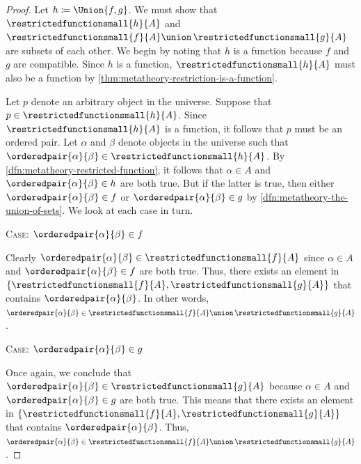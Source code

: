 \begin{proof}
    Let \( h \coloneq \Union \mleft\{ f, g \mright\} \).
    We must show that \( \restrictedfunctionsmall{h}{A} \) and \( \restrictedfunctionsmall{f}{A} \union \, \restrictedfunctionsmall{g}{A} \) are subsets of each other.
    We begin by noting that \( h \) is a function because \( f \) and \( g \) are compatible.
    Since \( h \) is a function, \( \restrictedfunctionsmall{h}{A} \) must also be a function by \cref{thm:metatheory-restriction-is-a-function}.

    \vspace{0.3cm}
    \noindent
    Let \( p \) denote an arbitrary object in the universe.
    Suppose that \( p \in \restrictedfunctionsmall{h}{A} \).
    Since \( \restrictedfunctionsmall{h}{A} \) is a function, it follows that \( p \) must be an ordered pair.
    Let \( \alpha \) and \( \beta \) denote objects in the universe such that \( \orderedpair{\alpha}{\beta} \in \restrictedfunctionsmall{h}{A} \).
    By \cref{dfn:metatheory-restricted-function}, it follows that \( \alpha \in A \) and \( \orderedpair{\alpha}{\beta} \in h \) are both true.
    But if the latter is true, then either \( \orderedpair{\alpha}{\beta} \in f \) or \( \orderedpair{\alpha}{\beta} \in g \) by
    \cref{dfn:metatheory-the-union-of-sets}.
    We look at each case in turn.

    \vspace{0.3cm}
    \noindent
    {\scshape Case:} \( \orderedpair{\alpha}{\beta} \in f \)

    \vspace{0.1cm}
    \noindent
    Clearly \( \orderedpair{\alpha}{\beta} \in \restrictedfunctionsmall{f}{A} \) since \( \alpha \in A \) and \( \orderedpair{\alpha}{\beta} \in f \) are both true.
    Thus, there exists an element in \( \mleft\{ \restrictedfunctionsmall{f}{A}, \restrictedfunctionsmall{g}{A} \mright\} \) that contains \( \orderedpair{\alpha}{\beta} \).
    In other words, \( \orderedpair{\alpha}{\beta} \in \restrictedfunctionsmall{f}{A} \union \, \restrictedfunctionsmall{g}{A} \).

    \vspace{0.3cm}
    \noindent
    {\scshape Case:} \( \orderedpair{\alpha}{\beta} \in g \)

    \vspace{0.1cm}
    \noindent
    Once again, we conclude that \( \orderedpair{\alpha}{\beta} \in \restrictedfunctionsmall{g}{A} \) because \( \alpha \in A \) and \( \orderedpair{\alpha}{\beta} \in g \)
    are both true.
    This means that there exists an element in \( \mleft\{ \restrictedfunctionsmall{f}{A}, \restrictedfunctionsmall{g}{A} \mright\} \)
    that contains \( \orderedpair{\alpha}{\beta} \).
    Thus, \( \orderedpair{\alpha}{\beta} \in \restrictedfunctionsmall{f}{A} \union \, \restrictedfunctionsmall{g}{A} \).


\end{proof}
